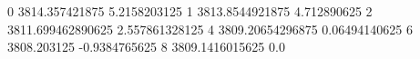 0 3814.357421875 5.2158203125
1 3813.8544921875 4.712890625
2 3811.699462890625 2.557861328125
4 3809.20654296875 0.06494140625
6 3808.203125 -0.9384765625
8 3809.1416015625 0.0
